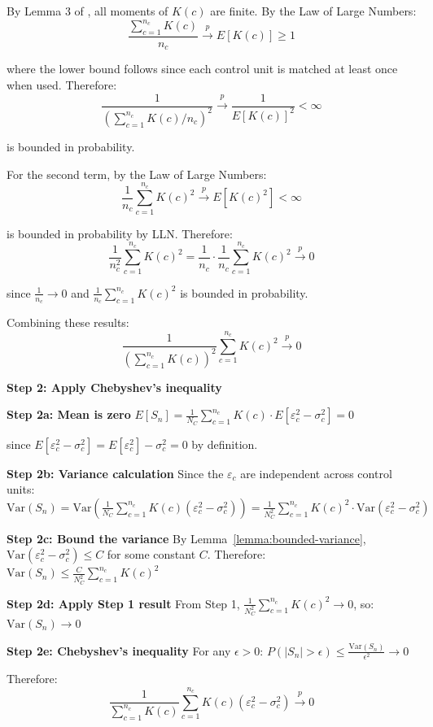 \documentclass{mytemplate}
\begin{document}
By Lemma 3 of \cite{abadie2006large}, all moments of $K(c)$ are finite. By the Law of Large Numbers:
$$\frac{\sum_{c=1}^{n_c} K(c)}{n_c} \xrightarrow{p} E[K(c)] \geq 1$$

where the lower bound follows since each control unit is matched at least once when used. Therefore:
$$\frac{1}{(\sum_{c=1}^{n_c} K(c)/n_c)^2} \xrightarrow{p} \frac{1}{E[K(c)]^2} < \infty$$

is bounded in probability.

For the second term, by the Law of Large Numbers:
$$\frac{1}{n_c} \sum_{c=1}^{n_c} K(c)^2 \xrightarrow{p} E[K(c)^2] < \infty$$

is bounded in probability by LLN. Therefore:
$$\frac{1}{n_c^2} \sum_{c=1}^{n_c} K(c)^2 = \frac{1}{n_c} \cdot \frac{1}{n_c} \sum_{c=1}^{n_c} K(c)^2 \xrightarrow{p} 0$$

since $\frac{1}{n_c} \to 0$ and $\frac{1}{n_c} \sum_{c=1}^{n_c} K(c)^2$ is bounded in probability.

Combining these results:
$$\frac{1}{(\sum_{c=1}^{n_c} K(c))^2} \sum_{c=1}^{n_c} K(c)^2 \xrightarrow{p} 0$$

\textbf{Step 2: Apply Chebyshev's inequality}

\textbf{Step 2a: Mean is zero}
$E[S_n] = \frac{1}{N_C} \sum_{c=1}^{n_c} K(c) \cdot E[\varepsilon_c^2-\sigma_c^2] = 0$

since $E[\varepsilon_c^2-\sigma_c^2] = E[\varepsilon_c^2] - \sigma_c^2 = 0$ by definition.

\textbf{Step 2b: Variance calculation}
Since the $\varepsilon_c$ are independent across control units:
$\text{Var}(S_n) = \text{Var}\left(\frac{1}{N_C} \sum_{c=1}^{n_c} K(c)(\varepsilon_c^2-\sigma_c^2)\right) = \frac{1}{N_C^2} \sum_{c=1}^{n_c} K(c)^2 \cdot \text{Var}(\varepsilon_c^2-\sigma_c^2)$

\textbf{Step 2c: Bound the variance}
By Lemma~\ref{lemma:bounded-variance}, $\text{Var}(\varepsilon_c^2-\sigma_c^2) \leq C$ for some constant $C$. Therefore:
$\text{Var}(S_n) \leq \frac{C}{N_C^2} \sum_{c=1}^{n_c} K(c)^2$

\textbf{Step 2d: Apply Step 1 result}
From Step 1, $\frac{1}{N_C^2} \sum_{c=1}^{n_c} K(c)^2 \to 0$, so:
$\text{Var}(S_n) \to 0$

\textbf{Step 2e: Chebyshev's inequality}
For any $\epsilon > 0$:
$P(|S_n| > \epsilon) \leq \frac{\text{Var}(S_n)}{\epsilon^2} \to 0$

Therefore:
$$\frac{1}{\sum_{c=1}^{n_c} K(c)} \sum_{c=1}^{n_c} K(c)(\varepsilon_c^2-\sigma_c^2) \xrightarrow{p} 0$$
\end{document}
